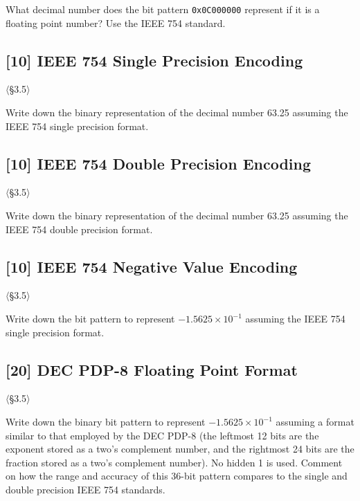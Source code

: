 \noindent What decimal number does the bit pattern \texttt{0x0C000000}
represent if it is a floating point number? Use the IEEE 754 standard.

\problembreak

\subsection{[10] IEEE 754 Single Precision Encoding}
\hypertarget{prob-3.23}{}
\noindent$\langle$\S3.5$\rangle$\medskip

\noindent Write down the binary representation of the decimal number 63.25
assuming the IEEE 754 single precision format.

\problembreak

\subsection{[10] IEEE 754 Double Precision Encoding}
\hypertarget{prob-3.24}{}
\noindent$\langle$\S3.5$\rangle$\medskip

\noindent Write down the binary representation of the decimal number 63.25
assuming the IEEE 754 double precision format.

\problembreak

\subsection{[10] IEEE 754 Negative Value Encoding}
\hypertarget{prob-3.25}{}
\noindent$\langle$\S3.5$\rangle$\medskip

\noindent Write down the bit pattern to represent $-1.5625 \times 10^{-1}$
assuming the IEEE 754 single precision format.

\problembreak

\subsection{[20] DEC PDP-8 Floating Point Format}
\hypertarget{prob-3.26}{}
\noindent$\langle$\S3.5$\rangle$\medskip

\noindent Write down the binary bit pattern to represent
$-1.5625 \times 10^{-1}$ assuming a format similar to that employed by the
DEC PDP-8 (the leftmost 12 bits are the exponent stored as a two's complement
number, and the rightmost 24 bits are the fraction stored as a two's
complement number). No hidden 1 is used. Comment on how the range and
accuracy of this 36-bit pattern compares to the single and double precision
IEEE 754 standards.

